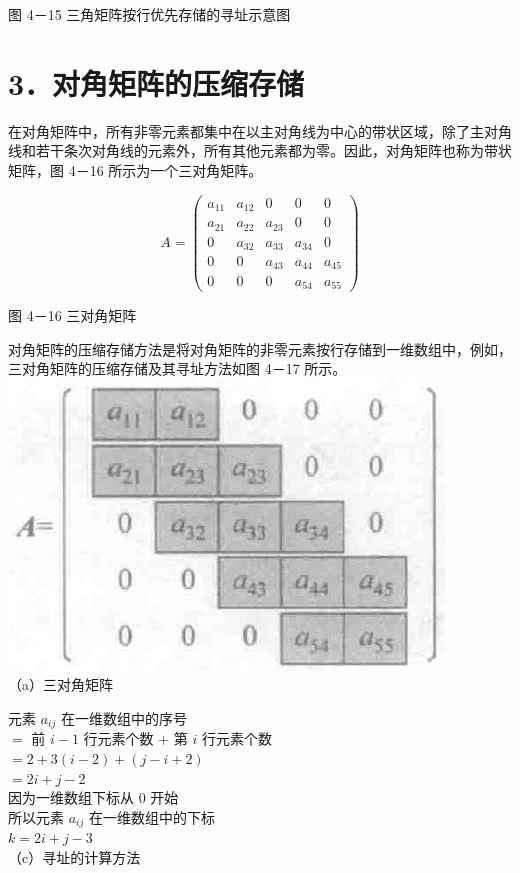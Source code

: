 \documentclass[10pt]{article}
\begin{document}
图 4－15 三角矩阵按行优先存储的寻址示意图

\section*{3．对角矩阵的压缩存储}
在对角矩阵中，所有非零元素都集中在以主对角线为中心的带状区域，除了主对角线和若干条次对角线的元素外，所有其他元素都为零。因此，对角矩阵也称为带状矩阵，图 4－16 所示为一个三对角矩阵。

$$
A=\left(\begin{array}{ccccc}
a_{11} & a_{12} & 0 & 0 & 0 \\
a_{21} & a_{22} & a_{23} & 0 & 0 \\
0 & a_{32} & a_{33} & a_{34} & 0 \\
0 & 0 & a_{43} & a_{44} & a_{45} \\
0 & 0 & 0 & a_{54} & a_{55}
\end{array}\right)
$$

图 4－16 三对角矩阵

对角矩阵的压缩存储方法是将对角矩阵的非零元素按行存储到一维数组中，例如，三对角矩阵的压缩存储及其寻址方法如图 4－17 所示。\\
\includegraphics[max width=\textwidth, center]{2025_06_06_704745ea57b15b2333e5g-124}\\
（a）三对角矩阵

元素 $a_{i j}$ 在一维数组中的序号\\
$=$ 前 $i-1$ 行元素个数 + 第 $i$ 行元素个数\\
$=2+3(i-2)+(j-i+2)$\\
$=2 i+j-2$\\
因为一维数组下标从 0 开始\\
所以元素 $a_{i j}$ 在一维数组中的下标\\
$k=2 i+j-3$\\
（c）寻址的计算方法
\end{document}
